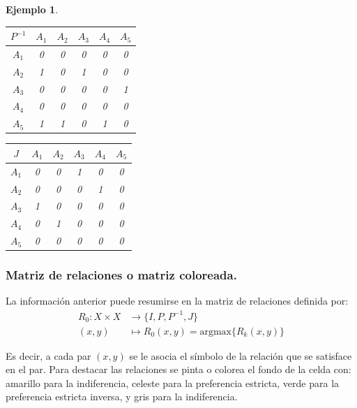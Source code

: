 \documentclass[a5paper,doc,10pt,noapacite]{apa6}
\newtheorem{ejem}{Ejemplo}
\begin{document}
{{\begin{ejem}
\begin{table}[H]
   \fontsize{7}{11}\selectfont
    \begin{minipage}{.5\linewidth}
      \centering
	\begin{tabular}{c|ccccc} \thickline
	\(P^{-1}\) & \(A_1\) & \(A_2\) & \(A_3\) & \(A_4\) & \(A_5\)  \\ \hline
    \(A_1\) & 0 & 0 & 0 & 0 & 0  \\
    \(A_2\) & 1 & 0 & 1 & 0 & 0  \\
	\(A_3\) & 0 & 0 & 0 & 0 & 1   \\
	\(A_4\) & 0 & 0 & 0 & 0 & 0   \\
	\(A_5\) & 1 & 1 & 0 & 1 & 0   \\
\end{tabular}
\label{tab:B4} 
    \end{minipage}%
    \begin{minipage}{.5\linewidth}
      \centering
	\begin{tabular}{c|ccccc} \thickline
	\(J\) & \(A_1\) & \(A_2\) & \(A_3\) & \(A_4\) & \(A_5\)  \\ \hline
    \(A_1\) & 0 & 0 & 1 & 0 & 0  \\
    \(A_2\) & 0 & 0 & 0 & 1 & 0  \\
	\(A_3\) & 1 & 0 & 0 & 0 & 0   \\
	\(A_4\) & 0 & 1 & 0 & 0 & 0   \\
	\(A_5\) & 0 & 0 & 0 & 0 & 0   \\
\end{tabular}
\label{tab:B5} 
    \end{minipage} 
\end{table}

\end{ejem}

\subsubsection{Matriz de relaciones o matriz coloreada.}

La información anterior puede resumirse en la matriz de relaciones definida por:
\begin{align*}
    R_0 : X \times X & \longrightarrow \big\{I, P , P^{-1}, J \big\} \\
    (x,y) & \mapsto R_0(x,y) = \text{argmax} \big\{R_k(x,y)\big\}
\end{align*}

Es decir, a cada par \((x,y)\) se le asocia el símbolo de la relación que se satisface en el par. Para destacar las relaciones se pinta o colorea el fondo de la celda con: amarillo para la indiferencia, celeste para la preferencia estricta, verde para la preferencia estricta inversa, y gris para la indiferencia.

}}
\end{document}
